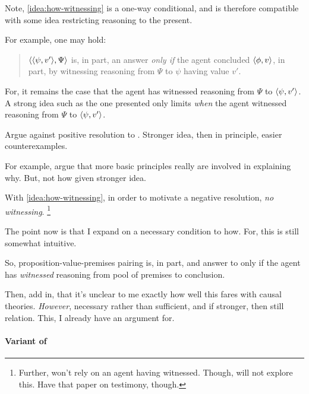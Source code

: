 \begin{note}
  Note, \autoref{idea:how-witnessing} is a one-way conditional, and is therefore compatible with some idea restricting reasoning to the present.

  For example, one may hold:
  \begin{quote}
    \(\langle \langle \psi, v' \rangle, \Psi \rangle\) is, in part, an answer \qHow{}
    \emph{only if}
    the agent concluded \(\langle \phi, v \rangle\), in part, by witnessing reasoning from \(\Psi\) to \(\psi\) having value \(v'\).
  \end{quote}
  For, it remains the case that the agent has witnessed reasoning from \(\Psi\) to \(\langle \psi, v' \rangle\).
  A strong idea such as the one presented only limits \emph{when} the agent witnessed reasoning from \(\Psi\) to \(\langle \psi, v' \rangle\).
\end{note}

\begin{note}
  Argue against positive resolution to \issueInclusion{}.
  Stronger idea, then in principle, easier counterexamples.

  For example, argue that more basic principles really are involved in explaining why.
  But, not how given stronger idea.

  With \autoref{idea:how-witnessing}, in order to motivate a negative resolution, \emph{no witnessing}.%
  \footnote{
    Further, won't rely on an agent having witnessed.
    Though, will not explore this.
    Have that paper on testimony, though.
  }
\end{note}


\begin{note}
  The point now is that I expand on a necessary condition to how.
  For, this is still somewhat intuitive.

  So, proposition-value-premises pairing is, in part, and answer to \qHow{} only if the agent has \emph{witnessed} reasoning from pool of premises to conclusion.

  Then, add in, that it's unclear to me exactly how well this fares with causal theories.
  \emph{However}, necessary rather than sufficient, and if stronger, then still relation.
  This, I already have an argument for.
\end{note}


\paragraph{Variant of \qHow{}}
\label{sec:clar:expand:qHow:variant}

